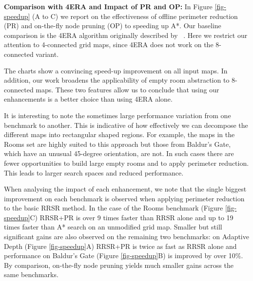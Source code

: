 \textbf{Comparison with 4ERA and Impact of PR and OP:}
In Figure \ref{fig-speedup} (A to C) we report on the 
effectiveness of offline perimeter reduction (PR) and on-the-fly 
node pruning (OP) to speeding up A*.
Our baseline comparison is the 4ERA algorithm 
originally described by \citeauthor{harabor10}~.
Here we restrict our attention to 4-connected grid maps,
since 4ERA does not work on the 8-connected variant.
\par
The charts show a convincing speed-up improvement on all input maps.
In addition, our work broadens the applicability of empty room abstraction
to 8-connected maps.
These two features allow us to conclude that using our enhancements is a better
choice than using 4ERA alone.
\par
It is interesting to note the sometimes large performance variation 
from one benchmark to another. This is indicative of how effectively we can 
decompose the different maps into rectangular shaped regions.
For example, the maps in the Rooms set are highly suited to this approach but those
from Baldur's Gate, which have an unusual 45-degree orientation, are not.
In such cases there are fewer opportunities to build large empty rooms and to apply perimeter reduction.
This leads to larger search spaces and reduced performance. 
\par
When analysing the impact of each enhancement,
we note that the single biggest improvement on each
benchmark is observed when applying perimeter reduction to the basic RRSR method.
In the case of the Rooms benchmark (Figure \ref{fig-speedup}C) RRSR+PR is over 9
times faster than RRSR alone and up to 19 times faster than A* search on an unmodified
grid map.
Smaller but still significant gains are also observed on the remaining two benchmarks:
on Adaptive Depth (Figure \ref{fig-speedup}A) RRSR+PR is twice as fast as RRSR alone
and performance on Baldur's Gate (Figure \ref{fig-speedup}B) is improved by over 10\%.
By comparison, on-the-fly node pruning yields much smaller gains across the same benchmarks.

